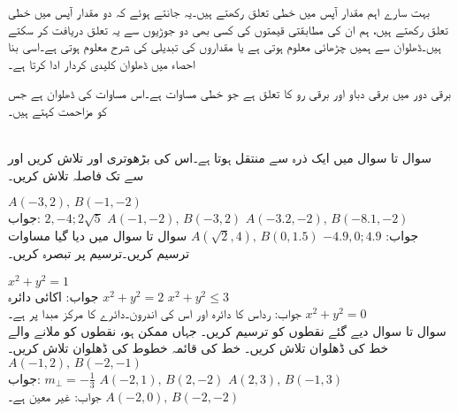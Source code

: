 بہت سارے اہم مقدار آپس میں خطی تعلق رکھتے ہیں۔یہ جانتے ہوئے کہ دو مقدار آپس میں خطی تعلق رکھتے ہیں، ہم ان کی مطابقتی قیمتوں کی کسی بھی دو جوڑیوں سے یہ تعلق دریافت کر سکتے ہیں۔ڈھلوان سے ہمیں چڑھائی معلوم ہوتی ہے یا مقداروں کی تبدیلی کی شرح معلوم ہوتی ہے۔اسی بنا احصاء میں ڈھلوان کلیدی کردار ادا کرتا ہے۔ 

برقی دور میں برقی دباو  اور برقی رو  کا تعلق  ہے جو خطی مساوات ہے۔اس مساوات کی ڈھلوان  ہے جس کو مزاحمت کہتے ہیں۔

\\
سوال  تا سوال  میں ایک ذرہ  سے  منتقل ہوتا ہے۔اس کی بڑھوتری  اور  تلاش کریں اور  سے  تک فاصلہ تلاش کریں۔

$A(-3,2),\, B(-1,-2)$\\
جواب:\quad
$2,-4;2\sqrt{5}$
$A(-1,-2),\, B(-3,2)$
$A(-3.2,-2),\, B(-8.1,-2)$\\
جواب:\quad
$-4.9,0;4.9$
$A(\sqrt{2},4),\, B(0,1.5)$
سوال  تا سوال  میں دیا گیا مساوات ترسیم کریں۔ترسیم پر تبصرہ کریں۔

$x^2+y^2=1$\\
جواب:\quad
اکائی دائرہ
$x^2+y^2=2$
$x^2+y^2\le 3$\\
جواب:\quad
رداس  کا دائرہ اور اس کی اندرون۔دائرے کا مرکز مبدا پر ہے۔
$x^2+y^2=0$
\\
سوال  تا سوال  دیے گئے نقطوں کو ترسیم کریں۔ جہاں ممکن ہو، نقطوں کو ملانے والے خط کی  ڈھلوان تلاش کریں۔ خط  کی قائمہ خطوط کی ڈھلوان تلاش کریں۔\\

$A(-1,2),\,B(-2,-1)$\\
جواب:\quad
$m_{\perp}=-\tfrac{1}{3}$
$A(-2,1),\,B(2,-2)$
$A(2,3),\,B(-1,3)$\\
جواب:\quad
{} غیر معین ہے۔
$A(-2,0),\,B(-2,-2)$

